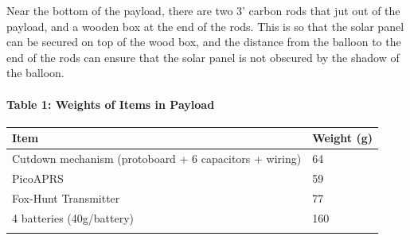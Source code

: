 \documentclass[12pt,]{article}
\let\oldparagraph\paragraph
\renewcommand{\paragraph}[1]{\oldparagraph{#1}\mbox{}}
\begin{document}
Near the bottom of the payload, there are two 3' carbon rods that jut
out of the payload, and a wooden box at the end of the rods. This is so
that the solar panel can be secured on top of the wood box, and the
distance from the balloon to the end of the rods can ensure that the
solar panel is not obscured by the shadow of the balloon.

\paragraph{Table 1: Weights of Items in
Payload}\label{table-1-weights-of-items-in-payload}

\begin{longtable}[]{@{}ll@{}}
\toprule
\begin{minipage}[b]{0.72\columnwidth}\raggedright\strut
Item\strut
\end{minipage} & \begin{minipage}[b]{0.22\columnwidth}\raggedright\strut
Weight (g)\strut
\end{minipage}\tabularnewline
\midrule
\endhead
\begin{minipage}[t]{0.72\columnwidth}\raggedright\strut
Cutdown mechanism (protoboard + 6 capacitors + wiring)\strut
\end{minipage} & \begin{minipage}[t]{0.22\columnwidth}\raggedright\strut
64\strut
\end{minipage}\tabularnewline
\begin{minipage}[t]{0.72\columnwidth}\raggedright\strut
PicoAPRS\strut
\end{minipage} & \begin{minipage}[t]{0.22\columnwidth}\raggedright\strut
59\strut
\end{minipage}\tabularnewline
\begin{minipage}[t]{0.72\columnwidth}\raggedright\strut
Fox-Hunt Transmitter\strut
\end{minipage} & \begin{minipage}[t]{0.22\columnwidth}\raggedright\strut
77\strut
\end{minipage}\tabularnewline
\begin{minipage}[t]{0.72\columnwidth}\raggedright\strut
4 batteries (40g/battery)\strut
\end{minipage} & \begin{minipage}[t]{0.22\columnwidth}\raggedright\strut
160\strut
\end{minipage}\tabularnewline
\begin{minipage}[t]{0.72\columnwidth}\raggedright\strut

\end{minipage}
\end{longtable}
\end{document}
